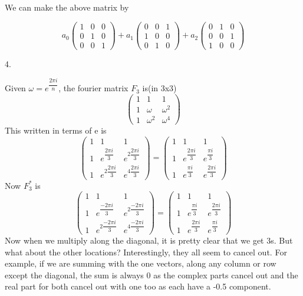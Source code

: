 \documentclass{article}
\begin{document}
We can make the above matrix by

\begin{equation}
	a_0\begin{pmatrix}
		1 & 0 & 0 \\
		0 & 1 & 0 \\
		0 & 0 & 1
	\end{pmatrix}
+a_1\begin{pmatrix}
	0 & 0 & 1 \\
	1 & 0 & 0 \\
	0 & 1 & 0
\end{pmatrix} + a_2
\begin{pmatrix}
	0 & 1 & 0 \\
	0 & 0 & 1 \\
	1 & 0 & 0
\end{pmatrix}
\end{equation}

4.

Given $\omega = e^{\dfrac{2\pi i}{n}}$, the fourier matrix $F_3$ is(in 3x3)
\begin{equation}
	\begin{pmatrix}
		1 & 1 & 1 \\
		1 & \omega & \omega^2 \\
		1& \omega^2 & \omega^4
	\end{pmatrix}
\end{equation}
This written in terms of e is
\begin{equation}
	\begin{pmatrix}
		1 & 1 & 1 \\
		1 & e^{\dfrac{2\pi i}{3}} & e^{2\dfrac{2\pi i}{3}} \\
		1& e^{2\dfrac{2\pi i}{3}} & e^{4\dfrac{2\pi i}{3}}
	\end{pmatrix}=
	\begin{pmatrix}
		1 & 1 & 1 \\
		1 & e^{\dfrac{2\pi i}{3}} & e^{\dfrac{\pi i}{3}} \\
		1& e^{\dfrac{\pi i}{3}} & e^{\dfrac{2\pi i}{3}}
	\end{pmatrix}
\end{equation}
Now $F^{*}_3$ is
\begin{equation}
	\begin{pmatrix}
		1 & 1 & 1 \\
		1 & e^{\dfrac{-2\pi i}{3}} & e^{2\dfrac{-2\pi i}{3}} \\
		1& e^{2\dfrac{-2\pi i}{3}} & e^{4\dfrac{-2\pi i}{3}}
	\end{pmatrix}=
	\begin{pmatrix}
	1 & 1 & 1 \\
	1 & e^{\dfrac{\pi i}{3}} & e^{\dfrac{2\pi i}{3}} \\
	1& e^{\dfrac{2\pi i}{3}} & e^{\dfrac{\pi i}{3}}
	\end{pmatrix}
\end{equation}
Now when we multiply along the diagonal, it is pretty clear that we get 3s. But what about the other locations? Interestingly, they all seem to cancel out. For example, if we are summing with the one vectors, along any column or row except the diagonal, the sum is always 0 as the complex parts cancel out and the real part for both cancel out with one too as each have a -0.5 component.
\end{document}

